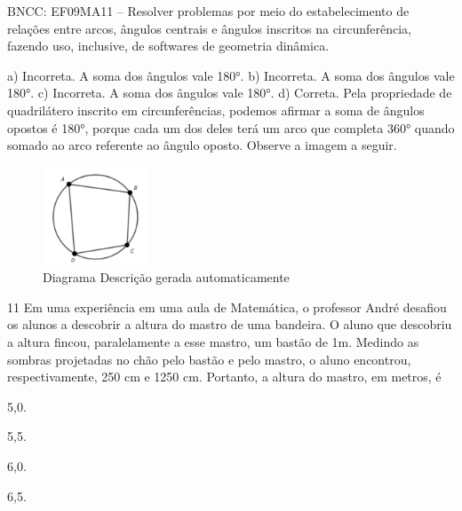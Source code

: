 \begin{escolha}
\begin{escolha}
\begin{escolha}
\begin{escolha}
{\begin{boxmedio}
\begin{boxpeq}
\begin{q°}
\begin{boxmedio}
\begin{boxpeq}
\begin{boxpeq}
\begin{boxmedio}
\begin{boxmedio}
\begin{boxmedio}
\begin{largebox}
\begin{boxmedio}
{{BNCC: EF09MA11 -- Resolver problemas por meio do estabelecimento de
relações entre arcos, ângulos centrais e ângulos inscritos na
circunferência, fazendo uso, inclusive, de softwares de geometria
dinâmica.

a) Incorreta. A soma dos ângulos vale 180°.
b) Incorreta. A soma dos ângulos vale 180°.
c) Incorreta. A soma dos ângulos vale 180°.
d) Correta. Pela propriedade de quadrilátero inscrito em circunferências, 
podemos afirmar a soma de ângulos opostos é 180°, porque cada um 
dos deles terá um arco que completa 360° quando somado ao arco referente 
ao ângulo oposto. Observe a imagem a seguir.

\begin{figure}
\centering
\includegraphics[width=1.22917in,height=1.15573in]{./_SAEB_9_MAT/media/image254.png}
\caption{Diagrama Descrição gerada automaticamente}
\end{figure}
}

\num{11} Em uma experiência em uma aula de Matemática, o professor André
desafiou os alunos a descobrir a altura do mastro de uma bandeira. O aluno
que descobriu a altura fincou, paralelamente a esse mastro, um bastão de
1m. Medindo as sombras projetadas no chão pelo bastão e pelo mastro,
o aluno encontrou, respectivamente, 250 cm e 1250 cm. Portanto, a altura do
mastro, em metros, é

\begin{escolha}

  \item 5,0.

  \item 5,5.

  \item 6,0.

  \item 6,5.

\end{escolha}

}
\end{boxmedio}
\end{largebox}
\end{boxmedio}
\end{boxmedio}
\end{boxmedio}
\end{boxpeq}
\end{boxpeq}
\end{boxmedio}
\end{q°}
\end{boxpeq}
\end{boxmedio}}
\end{escolha}
\end{escolha}
\end{escolha}
\end{escolha}
